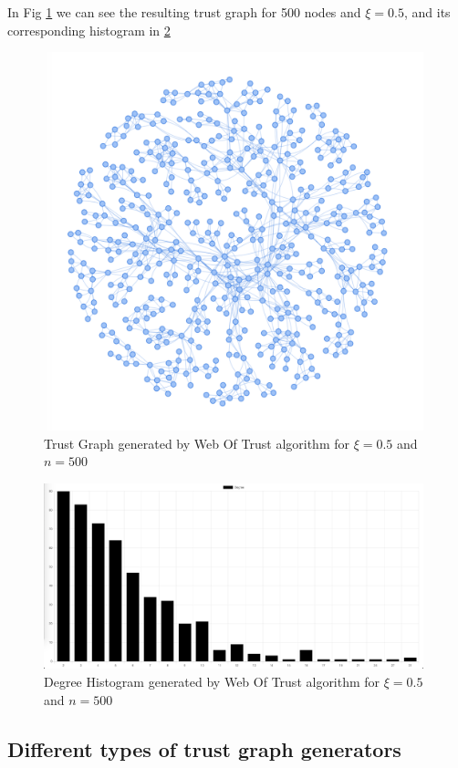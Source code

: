 \documentclass[nostrict]{szablonPG}
\begin{document}
In Fig \ref{fig:trustgraph500} we can see the resulting trust graph for 500 nodes and $\xi = 0.5$, and its corresponding histogram in \ref{fig:trustgraph500histogram}

\begin{figure}[h!]
    \includegraphics[width=11cm]{img/webOfTrust500Graph.png}
    \centering
    \caption{Trust Graph generated by Web Of Trust algorithm for $\xi=0.5$ and $n = 500$}
    \label{fig:trustgraph500}
\end{figure}

\begin{figure}[h!]
    \includegraphics[width=11cm]{img/webOfTrust500Hist.png}
    \centering
    \caption{Degree Histogram generated by Web Of Trust algorithm for $\xi=0.5$ and $n = 500$}
    \label{fig:trustgraph500histogram}
\end{figure} 

\subsection{Different types of trust graph generators}
\end{document}
